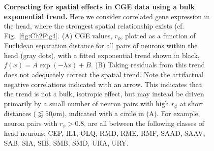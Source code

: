 \begin{figure}[h!]
 \caption{{\bf Correcting for spatial effects in CGE data using a bulk exponential trend.}
  Here we consider correlated gene expression in the head, where the strongest spatial relationship exists (cf. Fig.~\ref{fig:Ch2Fig4}. (A) CGE values, $r_\phi$, plotted as a function of Euclidean separation distance for all pairs of neurons within the head (gray dots), with a fitted exponential trend shown in black, $f(x) = A\exp(-\lambda x) + B$.
(B) Taking residuals from this trend does not adequately correct the spatial trend.
    Note the artifactual negative correlations indicated with an arrow.
    This indicates that the trend is not a bulk, isotropic effect, but may instead be driven primarily by a small number of neuron pairs with high $r_\phi$ at short distances ($\lessapprox 50\mu$m), indicated with a circle in (A).
For example, neuron pairs with $r_\phi > 0.8$, are all between the following classes of head neurons: CEP, IL1, OLQ, RMD, RME, RMF, SAAD, SAAV, SAB, SIA, SIB, SMB, SMD, URA, URY.}
\label{fig:Ch2S4_Fig}
\end{figure}


